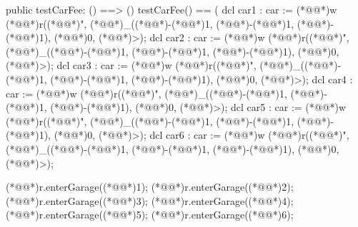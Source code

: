 \documentclass[a4paper]{article}
\begin{document}
\begin{vdm_al}
    public testCarFee: () ==> ()
    testCarFee() ==
    (
        dcl car1 : car := (*@@*)w (*@@*)r((*@@*)", (*@@*)_((*@\vdmnotcovered{}@*)-(*@\vdmnotcovered{}@*)1, (*@\vdmnotcovered{}@*)-(*@\vdmnotcovered{}@*)1, (*@\vdmnotcovered{}@*)-(*@\vdmnotcovered{}@*)1), (*@\vdmnotcovered{}@*)0, (*@@*)>);
        dcl car2 : car := (*@@*)w (*@@*)r((*@@*)", (*@@*)_((*@\vdmnotcovered{}@*)-(*@\vdmnotcovered{}@*)1, (*@\vdmnotcovered{}@*)-(*@\vdmnotcovered{}@*)1, (*@\vdmnotcovered{}@*)-(*@\vdmnotcovered{}@*)1), (*@\vdmnotcovered{}@*)0, (*@@*)>);
        dcl car3 : car := (*@@*)w (*@@*)r((*@@*)", (*@@*)_((*@\vdmnotcovered{}@*)-(*@\vdmnotcovered{}@*)1, (*@\vdmnotcovered{}@*)-(*@\vdmnotcovered{}@*)1, (*@\vdmnotcovered{}@*)-(*@\vdmnotcovered{}@*)1), (*@\vdmnotcovered{}@*)0, (*@@*)>);
        dcl car4 : car := (*@@*)w (*@@*)r((*@@*)", (*@@*)_((*@\vdmnotcovered{}@*)-(*@\vdmnotcovered{}@*)1, (*@\vdmnotcovered{}@*)-(*@\vdmnotcovered{}@*)1, (*@\vdmnotcovered{}@*)-(*@\vdmnotcovered{}@*)1), (*@\vdmnotcovered{}@*)0, (*@@*)>);
        dcl car5 : car := (*@@*)w (*@@*)r((*@@*)", (*@@*)_((*@\vdmnotcovered{}@*)-(*@\vdmnotcovered{}@*)1, (*@\vdmnotcovered{}@*)-(*@\vdmnotcovered{}@*)1, (*@\vdmnotcovered{}@*)-(*@\vdmnotcovered{}@*)1), (*@\vdmnotcovered{}@*)0, (*@@*)>);
        dcl car6 : car := (*@@*)w (*@@*)r((*@@*)", (*@@*)_((*@\vdmnotcovered{}@*)-(*@\vdmnotcovered{}@*)1, (*@\vdmnotcovered{}@*)-(*@\vdmnotcovered{}@*)1, (*@\vdmnotcovered{}@*)-(*@\vdmnotcovered{}@*)1), (*@\vdmnotcovered{}@*)0, (*@@*)>);

        (*@@*)r.enterGarage((*@@*)1);
        (*@@*)r.enterGarage((*@@*)2);
        (*@@*)r.enterGarage((*@@*)3);
        (*@@*)r.enterGarage((*@@*)4);
        (*@@*)r.enterGarage((*@@*)5);
        (*@@*)r.enterGarage((*@@*)6);
        

\end{vdm_al}
\end{document}

